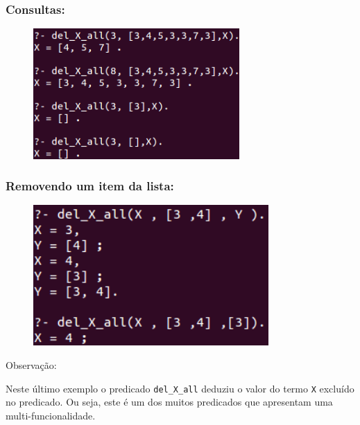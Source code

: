 \documentclass[sans]{beamer}
\begin{document}

\begin{frame}
\frametitle{Consultas:}

\begin{figure}[!htb]
\centering
\includegraphics[width=0.7\textwidth , height=0.7\textheight]{figuras/listaremosao.png}
\label{listaconsultas}
\end{figure}
 
\end{frame}


\begin{frame}
\frametitle{Removendo um item da lista:}

\begin{figure}[!htb]
\centering
\includegraphics[width=0.8\textwidth , height=0.5\textheight]{figuras/listaremosao1.png}
\label{listaconsultas}
\end{figure}
    
\begin{block}{Observação:}
   
Neste último exemplo  o predicado 
{\tt del\_X\_all} deduziu o valor do termo {\tt X} 
excluído no predicado. Ou seja, este é um
dos muitos predicados que apresentam uma
multi-funcionalidade.
    
\end{block}
\end{frame}
\end{document}
